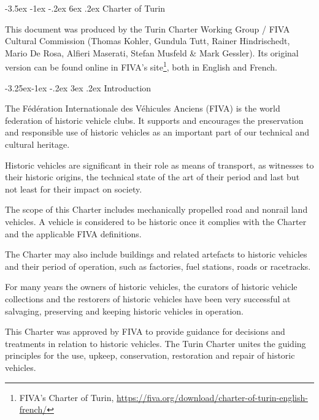 \documentclass[11pt]{article}
\makeatletter
\renewcommand\section{\@startsection {section}{1}{\z@}%
                                   {-3.5ex \@plus -1ex \@minus -.2ex}%
                                   {6ex \@plus.2ex}%
                                   {\normalfont\fontfamily{phv}\fontsize{16}{19}\bfseries}}
\renewcommand\subsection{\@startsection{subsection}{2}{\z@}%
                                     {-3.25ex\@plus -1ex \@minus -.2ex}%
                                     {3ex \@plus .2ex}%
                                     {\normalfont\fontfamily{phv}\fontsize{14}{17}\bfseries}}
\let\oldappendix\appendix %
\renewcommand\appendix{%
    \oldappendix
    \newcommand{\section@cntformat}{Annex~\thesection\quad}
}
\makeatother
\begin{document}


\setlength{\parindent}{0.25in}
\appendix

\section{Charter of Turin}
\label{sec:charter_of_turin}

This document was produced by the Turin Charter Working Group / FIVA Cultural Commission (Thomas Kohler, Gundula Tutt, Rainer Hindrischedt, Mario De Rosa, Alfieri Maserati, Stefan Musfeld \& Mark Gessler). Its original version can be found online in FIVA's site\footnote{FIVA's Charter of Turin, \url{https://fiva.org/download/charter-of-turin-english-french/}}, both in English and French.


\subsection{Introduction}

The Fédération Internationale des Véhicules Anciens (FIVA) is the world federation of historic vehicle clubs. It supports and encourages the preservation and responsible use of historic vehicles as an important part of our technical and cultural heritage.

Historic vehicles are significant in their role as means of transport, as witnesses to their historic origins, the technical state of the art of their period and last but not least for their impact on society.

The scope of this Charter includes mechanically propelled road and nonrail land vehicles. A vehicle is considered to be historic once it complies with the Charter and the applicable FIVA definitions.

The Charter may also include buildings and related artefacts to historic vehicles and their period of operation, such as factories, fuel stations, roads or racetracks.

For many years the owners of historic vehicles, the curators of historic vehicle collections and the restorers of historic vehicles have been very successful at salvaging, preserving and keeping historic vehicles in operation.

This Charter was approved by FIVA to provide guidance for decisions and treatments in relation to historic vehicles. The Turin Charter unites the guiding principles for the use, upkeep, conservation, restoration and repair of historic vehicles.
\end{document}
